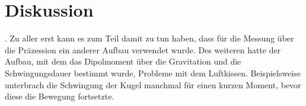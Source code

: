\section{Diskussion}
. Zu aller erst kann es zum Teil damit zu tun haben, dass für die Messung über die 
Präzession ein anderer Aufbau verwendet wurde. Des weiteren hatte der Aufbau, mit dem das Dipolmoment über die Gravitation und 
die Schwingungsdauer bestimmt wurde, Probleme mit dem Luftkissen. Beispielsweise unterbrach die Schwingung der Kugel manchmal für 
einen kurzen Moment, bevor diese die Bewegung fortsetzte.
\label{sec:Diskussion}
